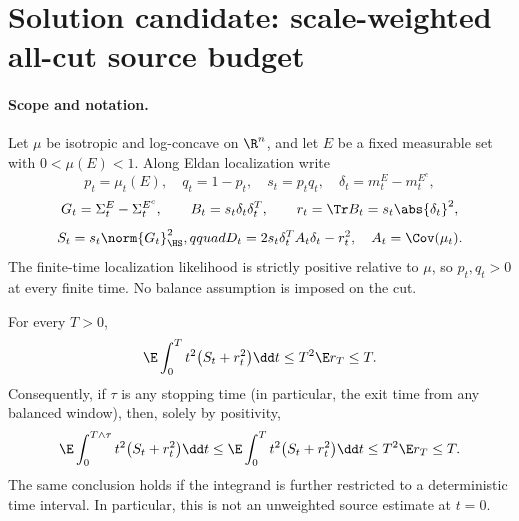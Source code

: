 \documentclass[../main.tex]{subfiles}
\begin{document}
%
\section*{Solution candidate: scale-weighted all-cut source budget}
\label{sec:sol-time-weighted-source}

\paragraph{Scope and notation.}
Let $\mu$ be isotropic and log-concave on $\R^n$, and let $E$ be a fixed measurable set with
$0<\mu(E)<1$.  Along Eldan localization write
\[
 p_t=\mu_t(E),\quad q_t=1-p_t,\quad s_t=p_tq_t,
 \quad \delta_t=m_t^E-m_t^{E^c},
\]
\[
 G_t=\Sigma_t^E-\Sigma_t^{E^c},\qquad
 B_t=s_t\delta_t\delta_t^T,\qquad
 r_t=\Tr B_t=s_t\abs{\delta_t}^2,
\]
\[
 S_t=s_t\norm{G_t}_{\HS}^2,qquad
 D_t=2s_t\delta_t^TA_t\delta_t-r_t^2,
 \quad A_t=\Cov(\mu_t).
\]
The finite-time localization likelihood is strictly positive relative to $\mu$, so
$p_t,q_t>0$ at every finite time.  No balance assumption is imposed on the cut.

\begin{theorem}
\label{thm:sol-time-weighted-source}
For every $T>0$,
\begin{equation}
 \E\int_0^T t^2\bigl(S_t+r_t^2\bigr)\dd t
 \le T^2\E r_T\le T.
 \label{eq:sol-time-weighted-source}
\end{equation}
Consequently, if $\tau$ is any stopping time (in particular, the exit time from any balanced
window), then, solely by positivity,
\begin{equation}
 \E\int_0^{T\wedge\tau}t^2\bigl(S_t+r_t^2\bigr)\dd t
 \le \E\int_0^Tt^2\bigl(S_t+r_t^2\bigr)\dd t
 \le T^2\E r_T\le T.
 \label{eq:sol-time-weighted-stopped}
\end{equation}
The same conclusion holds if the integrand is further restricted to a deterministic time
interval.  In particular, this is not an unweighted source estimate at $t=0$.
\end{theorem}
\end{document}
